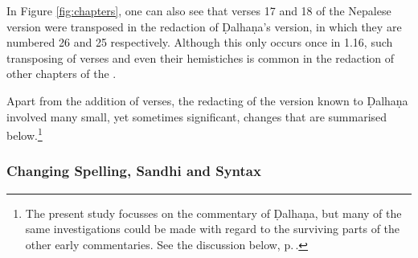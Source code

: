 In Figure \ref{fig:chapters}, one can also see that verses 17 and 18 of the
Nepalese version were transposed in the redaction of Ḍalhaṇa's version, in which
they are numbered 26 and 25 respectively. Although this only occurs once in 1.16,
such transposing of verses and even their hemistiches is common in the
redaction of other chapters of the \SS.

Apart from the addition of verses, the redacting of the version known to Ḍalhaṇa involved 
many small, yet sometimes significant, changes that are summarised below.\footnote{The 
present study focusses on the commentary of Ḍalhaṇa, but many of the same investigations
    could be made with regard to the surviving parts of the other early commentaries. See the 
    discussion below, p.\,\pageref{ref:dalhana}.}

\subsubsection{Changing Spelling, Sandhi and Syntax}


